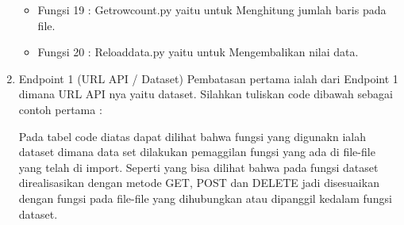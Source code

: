 \begin{enumerate}
\begin{itemize}
            
        \item Fungsi 19 : Getrowcount.py yaitu untuk Menghitung jumlah baris pada file.
            
        \item Fungsi 20 : Reloaddata.py yaitu untuk Mengembalikan nilai data.
            
      \end{itemize}
        
  \item Endpoint 1 (URL API / Dataset)
  Pembatasan pertama ialah dari Endpoint 1 dimana URL API nya yaitu dataset. Silahkan tuliskan code dibawah sebagai contoh pertama :
  
  
  Pada tabel code diatas dapat dilihat bahwa fungsi yang digunakn ialah dataset dimana data set dilakukan pemaggilan fungsi yang ada di file-file yang telah di import. Seperti yang bisa dilihat bahwa pada fungsi dataset direalisasikan dengan metode GET, POST dan DELETE jadi disesuaikan dengan fungsi pada file-file yang dihubungkan atau dipanggil kedalam fungsi dataset.
\end{enumerate}

